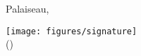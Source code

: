 \clearpage
\section*{}

\vspace{2em}
\makeatletter
Palaiseau, \@date
\par\vspace{1cm}
\texttt{[image: figures/signature]} \\
(\@author)
\makeatother

